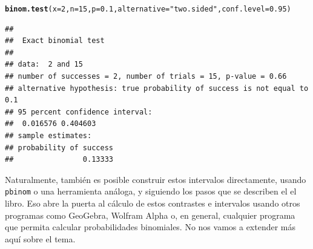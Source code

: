 \documentclass[10pt,a4paper]{article}\usepackage[]{graphicx}\usepackage[]{color}
\makeatletter
\newcommand{\hlnum}[1]{\textcolor[rgb]{0.686,0.059,0.569}{#1}}%
\newcommand{\hlstr}[1]{\textcolor[rgb]{0.192,0.494,0.8}{#1}}%
\newcommand{\hlstd}[1]{\textcolor[rgb]{0.345,0.345,0.345}{#1}}%
\newcommand{\hlkwc}[1]{\textcolor[rgb]{0.333,0.667,0.333}{#1}}%
\newcommand{\hlkwd}[1]{\textcolor[rgb]{0.737,0.353,0.396}{\textbf{#1}}}%
\newenvironment{kframe}{%
 \def\at@end@of@kframe{}%
 \ifinner\ifhmode%
  \def\at@end@of@kframe{\end{minipage}}%
  \begin{minipage}{\columnwidth}%
 \fi\fi%
 \def\FrameCommand##1{\hskip\@totalleftmargin \hskip-\fboxsep
 \colorbox{shadecolor}{##1}\hskip-\fboxsep
     \hskip-\linewidth \hskip-\@totalleftmargin \hskip\columnwidth}%
 \MakeFramed {\advance\hsize-\width
   \@totalleftmargin\z@ \linewidth\hsize
   \@setminipage}}%
 {\par\unskip\endMakeFramed%
 \at@end@of@kframe}
\newenvironment{knitrout}{}{} %
\newcounter {cont01}
\makeatother
\begin{document}
\begin{knitrout}
\color{fgcolor}\begin{kframe}
\begin{alltt}
\hlkwd{binom.test}\hlstd{(}\hlkwc{x} \hlstd{=} \hlnum{2}\hlstd{,} \hlkwc{n} \hlstd{=} \hlnum{15}\hlstd{,} \hlkwc{p} \hlstd{=} \hlnum{0.1}\hlstd{,} \hlkwc{alternative} \hlstd{=} \hlstr{"two.sided"}\hlstd{,} \hlkwc{conf.level} \hlstd{=} \hlnum{0.95}\hlstd{)}
\end{alltt}
\begin{verbatim}
## 
## 	Exact binomial test
## 
## data:  2 and 15
## number of successes = 2, number of trials = 15, p-value = 0.66
## alternative hypothesis: true probability of success is not equal to 0.1
## 95 percent confidence interval:
##  0.016576 0.404603
## sample estimates:
## probability of success 
##                0.13333
\end{verbatim}
\end{kframe}
\end{knitrout}

Naturalmente, también es posible construir estos intervalos directamente, usando {\tt pbinom} o una herramienta análoga, y siguiendo los pasos que se describen el el libro. Eso abre la puerta al cálculo de estos contrastes e intervalos usando otros programas como GeoGebra, Wolfram Alpha o, en general, cualquier programa que permita calcular probabilidades binomiales. No nos vamos a extender más aquí sobre el tema.
\end{document}
